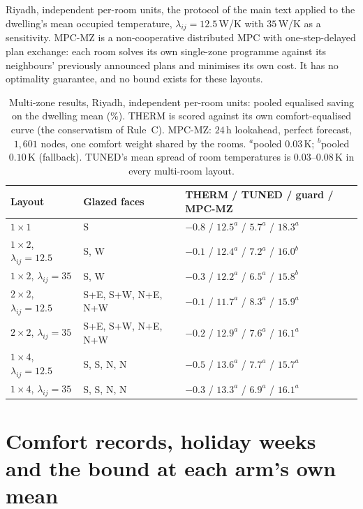 \documentclass[11pt]{article}
\newcommand{\lij}{\lambda_{ij}}
\begin{document}
Riyadh, independent per-room units, the protocol of the main text applied to the dwelling's mean occupied temperature, $\lij=12.5\,$W/K with $35\,$W/K as a sensitivity. MPC-MZ is a non-cooperative distributed MPC with one-step-delayed plan exchange: each room solves its own single-zone programme against its neighbours' previously announced plans and minimises its own cost. It has no optimality guarantee, and no bound exists for these layouts.

\begin{table}[!ht]
\centering
\caption{Multi-zone results, Riyadh, independent per-room units: pooled
equalised saving on the dwelling mean (\%). THERM is scored against its own
comfort-equalised curve (the conservatism of Rule~C). MPC-MZ: $24\,$h
lookahead, perfect forecast, $1{,}601$ nodes, one comfort weight shared by the
rooms. $^{a}$pooled $0.03\,$K; $^{b}$pooled $0.10\,$K (fallback).
TUNED's mean spread of room temperatures is $0.03$--$0.08\,$K in every multi-room layout.}
\label{tab:s-mz}
\small
\begin{tabularx}{\textwidth}{@{}llX@{}}
\toprule
Layout & Glazed faces & THERM / TUNED / guard / MPC-MZ \\
\midrule
$1\times1$ & S & $-0.8$ / $12.5^{a}$ / $5.7^{a}$ / $18.3^{a}$ \\
$1\times2$, $\lij=12.5$ & S, W & $-0.1$ / $12.4^{a}$ / $7.2^{a}$ / $16.0^{b}$ \\
$1\times2$, $\lij=35$ & S, W & $-0.3$ / $12.2^{a}$ / $6.5^{a}$ / $15.8^{b}$ \\
$2\times2$, $\lij=12.5$ & S+E, S+W, N+E, N+W & $-0.1$ / $11.7^{a}$ / $8.3^{a}$ / $15.9^{a}$ \\
$2\times2$, $\lij=35$ & S+E, S+W, N+E, N+W & $-0.2$ / $12.9^{a}$ / $7.6^{a}$ / $16.1^{a}$ \\
$1\times4$, $\lij=12.5$ & S, S, N, N & $-0.5$ / $13.6^{a}$ / $7.7^{a}$ / $15.7^{a}$ \\
$1\times4$, $\lij=35$ & S, S, N, N & $-0.3$ / $13.3^{a}$ / $6.9^{a}$ / $16.1^{a}$ \\
\bottomrule
\end{tabularx}
\end{table}

\section{Comfort records, holiday weeks and the bound at each arm's own mean}
\label{sec:s-comfort}
\end{document}
